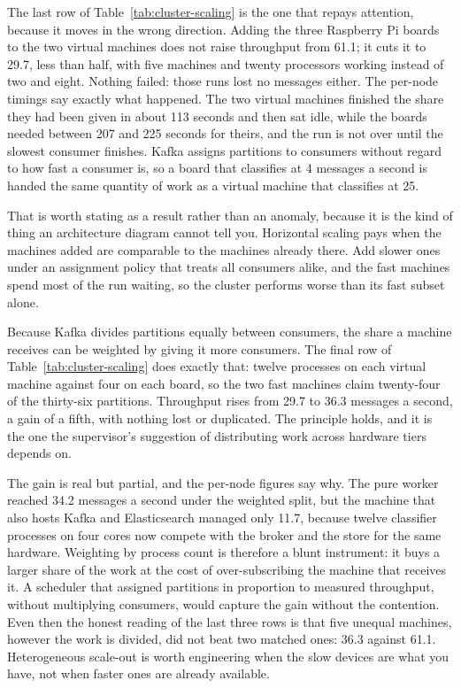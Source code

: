 The last row of Table~\ref{tab:cluster-scaling} is the one that repays attention, because it moves in the wrong direction. Adding the three Raspberry Pi boards to the two virtual machines does not raise throughput from 61.1; it cuts it to 29.7, less than half, with five machines and twenty processors working instead of two and eight. Nothing failed: those runs lost no messages either. The per-node timings say exactly what happened. The two virtual machines finished the share they had been given in about 113 seconds and then sat idle, while the boards needed between 207 and 225 seconds for theirs, and the run is not over until the slowest consumer finishes. Kafka assigns partitions to consumers without regard to how fast a consumer is, so a board that classifies at 4 messages a second is handed the same quantity of work as a virtual machine that classifies at 25.

That is worth stating as a result rather than an anomaly, because it is the kind of thing an architecture diagram cannot tell you. Horizontal scaling pays when the machines added are comparable to the machines already there. Add slower ones under an assignment policy that treats all consumers alike, and the fast machines spend most of the run waiting, so the cluster performs worse than its fast subset alone.

Because Kafka divides partitions equally between consumers, the share a machine receives can be weighted by giving it more consumers. The final row of Table~\ref{tab:cluster-scaling} does exactly that: twelve processes on each virtual machine against four on each board, so the two fast machines claim twenty-four of the thirty-six partitions. Throughput rises from 29.7 to 36.3 messages a second, a gain of a fifth, with nothing lost or duplicated. The principle holds, and it is the one the supervisor's suggestion of distributing work across hardware tiers depends on.

The gain is real but partial, and the per-node figures say why. The pure worker reached 34.2 messages a second under the weighted split, but the machine that also hosts Kafka and Elasticsearch managed only 11.7, because twelve classifier processes on four cores now compete with the broker and the store for the same hardware. Weighting by process count is therefore a blunt instrument: it buys a larger share of the work at the cost of over-subscribing the machine that receives it. A scheduler that assigned partitions in proportion to measured throughput, without multiplying consumers, would capture the gain without the contention. Even then the honest reading of the last three rows is that five unequal machines, however the work is divided, did not beat two matched ones: 36.3 against 61.1. Heterogeneous scale-out is worth engineering when the slow devices are what you have, not when faster ones are already available.

